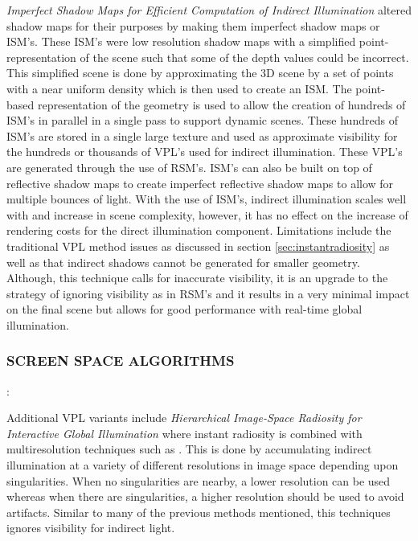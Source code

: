 \textit{Imperfect Shadow Maps for Efficient Computation of Indirect Illumination} \cite{Ritschel2008} altered shadow maps for their purposes by making them imperfect shadow maps or ISM's.  These ISM's were low resolution shadow maps with a simplified point-representation of the scene such that some of the depth values could be incorrect.  This simplified scene is done by approximating the 3D scene by a set of points with a near uniform density which is then used to create an ISM.  The point-based representation of the geometry is used to allow the creation of hundreds of ISM's in parallel in a single pass to support dynamic scenes.  These hundreds of ISM's are stored in a single large texture and used as approximate visibility for the hundreds or thousands of VPL's used for indirect illumination.  These VPL's are generated through the use of RSM's.  ISM's can also be built on top of reflective shadow maps to create imperfect reflective shadow maps to allow for multiple bounces of light.  With the use of ISM's, indirect illumination scales well with and increase in scene complexity, however, it has no effect on the increase of rendering costs for the direct illumination component.  Limitations include the traditional VPL method issues as discussed in section \ref{sec:instantradiosity} as well as that indirect shadows cannot be generated for smaller geometry.  Although, this technique calls for inaccurate visibility, it is an upgrade to the strategy of ignoring visibility as in RSM's and it results in a very minimal impact on the final scene but allows for good performance with real-time global illumination.

\subsubsection{SCREEN SPACE ALGORITHMS}: 

Additional VPL variants include \textit{Hierarchical Image-Space Radiosity for Interactive Global Illumination} \cite{Nichols2009} where instant radiosity is combined with multiresolution techniques such as \cite{Nichols2009a}.  This is done by accumulating indirect illumination at a variety of different resolutions in image space depending upon singularities.  When no singularities are nearby, a lower resolution can be used whereas when there are singularities, a higher resolution should be used to avoid artifacts.  Similar to many of the previous methods mentioned, this techniques ignores visibility for indirect light.

